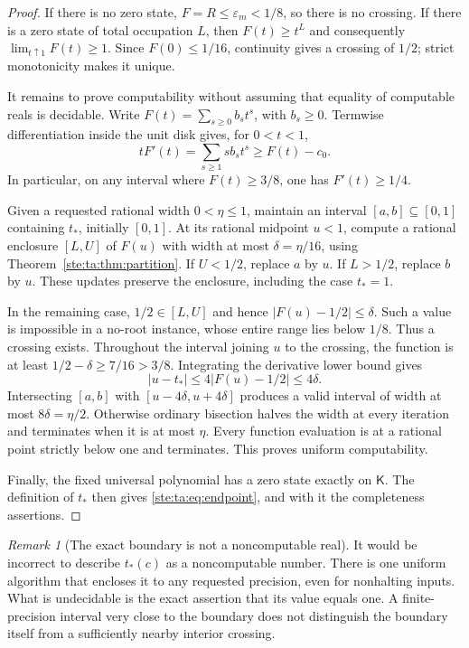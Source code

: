 \documentclass[11pt,letterpaper]{article}
\theoremstyle{definition}
\theoremstyle{remark}
\newtheorem{remark}[theorem]{Remark}
\newcommand{\abs}[1]{\left\lvert #1\right\rvert}
\newcommand{\epsm}{\varepsilon_m}
\begin{document}
\begin{proof}
If there is no zero state, $F=R\le\epsm<1/8$, so there is no crossing. If there is a zero state of total occupation $L$, then $F(t)\ge t^L$ and consequently $\lim_{t\uparrow1}F(t)\ge1$. Since $F(0)\le1/16$, continuity gives a crossing of $1/2$; strict monotonicity makes it unique.

It remains to prove computability without assuming that equality of computable reals is decidable. Write $F(t)=\sum_{s\ge0}b_s t^s$, with $b_s\ge0$. Termwise differentiation inside the unit disk gives, for $0<t<1$,
\begin{equation}\label{ste:ta:eq:slope}
tF'(t)=\sum_{s\ge1}s b_s t^s\ge F(t)-c_0.
\end{equation}
In particular, on any interval where $F(t)\ge3/8$, one has $F'(t)\ge1/4$.

Given a requested rational width $0<\eta\le1$, maintain an interval $[a,b]\subseteq[0,1]$ containing $t_*$, initially $[0,1]$. At its rational midpoint $u<1$, compute a rational enclosure $[L,U]$ of $F(u)$ with width at most $\delta=\eta/16$, using Theorem~\ref{ste:ta:thm:partition}. If $U<1/2$, replace $a$ by $u$. If $L>1/2$, replace $b$ by $u$. These updates preserve the enclosure, including the case $t_*=1$.

In the remaining case, $1/2\in[L,U]$ and hence $\abs{F(u)-1/2}\le\delta$. Such a value is impossible in a no-root instance, whose entire range lies below $1/8$. Thus a crossing exists. Throughout the interval joining $u$ to the crossing, the function is at least $1/2-\delta\ge7/16>3/8$. Integrating the derivative lower bound gives
\[
\abs{u-t_*}\le4\abs{F(u)-1/2}\le4\delta.
\]
Intersecting $[a,b]$ with $[u-4\delta,u+4\delta]$ produces a valid interval of width at most $8\delta=\eta/2$. Otherwise ordinary bisection halves the width at every iteration and terminates when it is at most $\eta$. Every function evaluation is at a rational point strictly below one and terminates. This proves uniform computability.

Finally, the fixed universal polynomial has a zero state exactly on $\mathsf K$. The definition of $t_*$ then gives \eqref{ste:ta:eq:endpoint}, and with it the completeness assertions.
\end{proof}

\begin{remark}[The exact boundary is not a noncomputable real]
It would be incorrect to describe $t_*(c)$ as a noncomputable number. There is one uniform algorithm that encloses it to any requested precision, even for nonhalting inputs. What is undecidable is the exact assertion that its value equals one. A finite-precision interval very close to the boundary does not distinguish the boundary itself from a sufficiently nearby interior crossing.
\end{remark}
\end{document}
